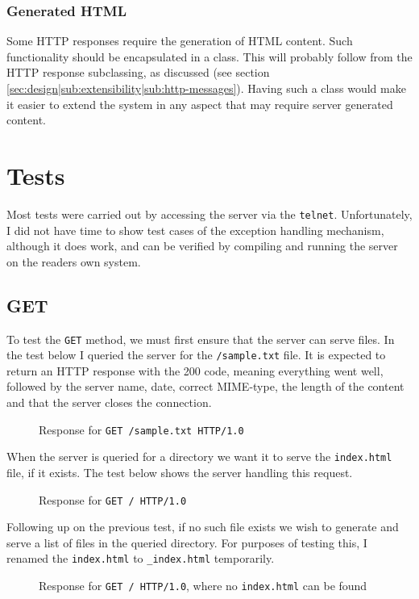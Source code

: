 \documentclass{acm_proc_article-sp}
\newcommand{\code}[1]{{\tt #1}}
\newcommand{\prog}[1]{{\tt #1}}
\newcommand{\secref}[1]{(see section \ref{#1})}
\begin{document}
\subsubsection{Generated HTML}
\label{sec:design|sub:extensibility|sub:generated-html}
Some HTTP responses require the generation of HTML content. Such functionality
should be encapsulated in a class. This will probably follow from the HTTP
response subclassing, as discussed \secref{sec:design|sub:extensibility|sub:http-messages}.
Having such a class would make it easier to extend the system in any aspect
that may require server generated content.

\section{Tests}
\label{sec:tests}
Most tests were carried out by accessing the server via the \prog{telnet}.
Unfortunately, I did not have time to show test cases of the exception
handling mechanism, although it does work, and can be verified by compiling
and running the server on the readers own system.

\subsection{GET}
To test the \code{GET} method, we must first ensure that the server can serve
files. In the test below I queried the server for the \code{/sample.txt} file.
It is expected to return an HTTP response with the 200 code, meaning
everything went well, followed by the server name, date, correct MIME-type,
the length of the content and that the server closes the connection.
\begin{figure}[H]
    
    \caption{Response for \code{GET /sample.txt HTTP/1.0}}
    \label{fig:get-file}
\end{figure}

When the server is queried for a directory we want it to serve the
\code{index.html} file, if it exists. The test below shows the server handling
this request.

\balancecolumns

\begin{figure}[H]
    
    \caption{Response for \code{GET / HTTP/1.0}}
    \label{fig:get-index}
\end{figure}

Following up on the previous test, if no such file exists we wish to generate
and serve a list of files in the queried directory. For purposes of testing
this, I renamed the \code{index.html} to \code{\_index.html} temporarily.
\begin{figure}[H]
    
    \caption{Response for \code{GET / HTTP/1.0}, where no \code{index.html} can be found}
    \label{fig:get-list}
\end{figure}
\end{document}
